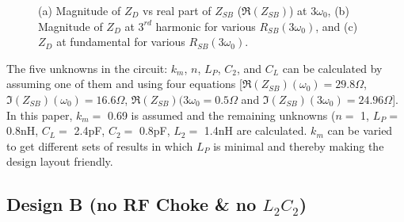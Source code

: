 \documentclass[conference]{IEEEtran}
\begin{document}
\begin{figure}[!t]
\begin{subfigure}{0.5\textwidth}
\caption{}
\label{fig:Design_A_Rn_var_1H}
\end{subfigure}
\caption{(a) Magnitude of $Z_{D}$ vs real part of $Z_{SB}$ ($\Re(Z_{SB})$) at $3\omega_0$, (b) Magnitude of $Z_D$ at $3^{rd}$ harmonic for various $R_{SB}(3\omega_0)$, and (c) $Z_D$ at fundamental for various $R_{SB}(3\omega_0)$.}
\label{fig:Design_A_Rn_var}
\vspace{-0.2in}
\end{figure}

The five unknowns in the circuit: $k_m$, $n$, $L_P$, $C_2$, and $C_L$ can be calculated by assuming one of them and using four equations [$\Re(Z_{SB})(\omega_0) =  29.8 \Omega$, $\Im(Z_{SB})(\omega_0) = 16.6\Omega$, $\Re(Z_{SB})(3\omega_0 = 0.5\Omega$ and  $\Im(Z_{SB})(3\omega_0) = 24.96\Omega$]. In this paper, $k_m=$ 0.69 is assumed and the remaining unknowns ($n =$ 1, $L_P =$ 0.8nH, $C_L =$ 2.4pF, $C_2 =$ 0.8pF, $L_2 =$ 1.4nH are calculated. $k_m$ can be varied to get different sets of results in which $L_P$ is minimal and thereby making the design layout friendly.


\subsection{Design B (no RF Choke \& no $L_2C_2$)}
\end{document}
